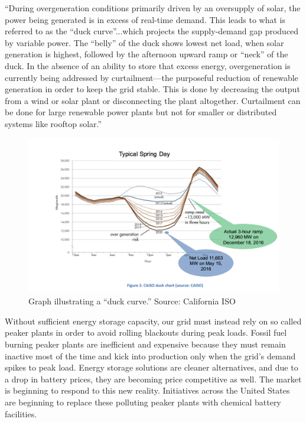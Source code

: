 \documentclass[hidelinks,12pt,a4paper]{article}
\begin{document}
\begin{displayquote}
“During overgeneration conditions primarily driven by an oversupply of solar, the power being generated is in excess of real-time demand. This leads to what is referred to as the “duck curve”...which projects the supply-demand gap produced by variable power. The “belly” of the duck shows lowest net load, when solar generation is highest, followed by the afternoon upward ramp or “neck” of the duck. In the absence of an ability to store that excess energy, overgeneration is currently being addressed by curtailment—the purposeful reduction of renewable generation in order to keep the grid stable. This is done by decreasing the output from a wind or solar plant or disconnecting the plant altogether. Curtailment can be done for large renewable power plants but not for smaller or distributed systems like rooftop solar.” \cite{EnergyStorageCaliforniaClimateandEnergyGoals}
\end{displayquote}

\begin{figure}[ht!]
    \centering
    \includegraphics[width=1\textwidth]{california-duck-curve.png}
    \caption{Graph illustrating a “duck curve.” Source: California ISO \cite{UsingRenewablesToOperateLowCarbonGrid}}
\end{figure}
\FloatBarrier

Without sufficient energy storage capacity, our grid must instead rely on so called peaker plants in order to avoid rolling blackouts during peak loads. Fossil fuel burning peaker plants are inefficient and expensive because they must remain inactive most of the time and kick into production only when the grid's demand spikes to peak load. Energy storage solutions are cleaner alternatives, and due to a drop in battery prices, they are becoming price competitive as well. The market is beginning to respond to this new reality. Initiatives across the United States are beginning to replace these polluting peaker plants with chemical battery facilities. \cite{StorageWillReplaceThreeCaliforniaGasPlants, NewYorkMovesToPhaseOutOlderPeakingPlants}
\end{document}
